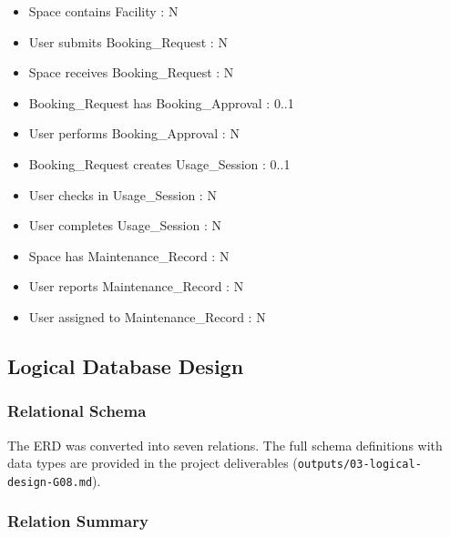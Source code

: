 \begin{itemize}
	\item Space contains Facility  : N
	\item User submits Booking\_Request  : N
	\item Space receives Booking\_Request  : N
	\item Booking\_Request has Booking\_Approval  : 0..1
	\item User performs Booking\_Approval  : N
	\item Booking\_Request creates Usage\_Session  : 0..1
	\item User checks in Usage\_Session  : N
	\item User completes Usage\_Session  : N
	\item Space has Maintenance\_Record  : N
	\item User reports Maintenance\_Record  : N
	\item User assigned to Maintenance\_Record  : N
\end{itemize}


\subsection{Logical Database Design}

\subsubsection{Relational Schema}

The ERD was converted into seven relations. The full schema definitions with data types are provided in the project deliverables (\texttt{outputs/03-logical-design-G08.md}).

\subsubsection{Relation Summary}


